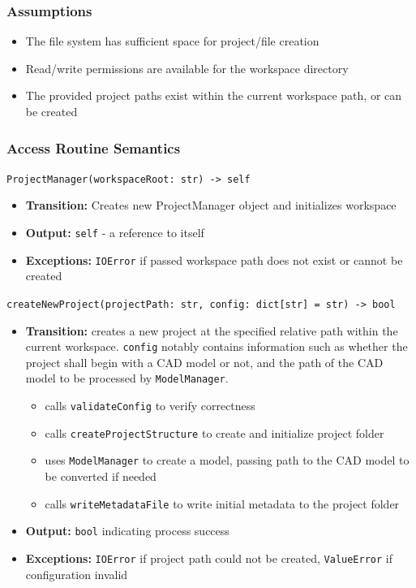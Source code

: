 \documentclass[12pt, titlepage]{article}
\begin{document}
\subsubsection{Assumptions}
\begin{itemize}
  \item The file system has sufficient space for project/file creation
  \item Read/write permissions are available for the workspace directory
  \item The provided project paths exist within the current workspace path, or can be created
\end{itemize}

\subsubsection{Access Routine Semantics}
\texttt{ProjectManager(workspaceRoot: str) -> self}
\begin{itemize}
  \item \textbf{Transition:} Creates new ProjectManager object and initializes workspace
  \item \textbf{Output:} \texttt{self} - a reference to itself
  \item \textbf{Exceptions:} \texttt{IOError} if passed workspace path does not exist or cannot be created
\end{itemize}
\texttt{createNewProject(projectPath: str, config: dict[str] = str) -> bool}
\begin{itemize}
  \item \textbf{Transition:} creates a new project at the specified relative path within the current workspace. \texttt{config} notably contains information such as whether the project shall begin with a CAD model or not, and the path of the CAD model to be processed by \texttt{ModelManager}.
  \begin{itemize}
    \item calls \texttt{validateConfig} to verify correctness
    \item calls \texttt{createProjectStructure} to create and initialize project folder
    \item uses \texttt{ModelManager} to create a model, passing path to the CAD model to be converted if needed
    \item calls \texttt{writeMetadataFile} to write initial metadata to the project folder
  \end{itemize}
  \item \textbf{Output:} \texttt{bool} indicating process success
  \item \textbf{Exceptions:} \texttt{IOError} if project path could not be created, \texttt{ValueError} if configuration invalid
\end{itemize}
\end{document}
